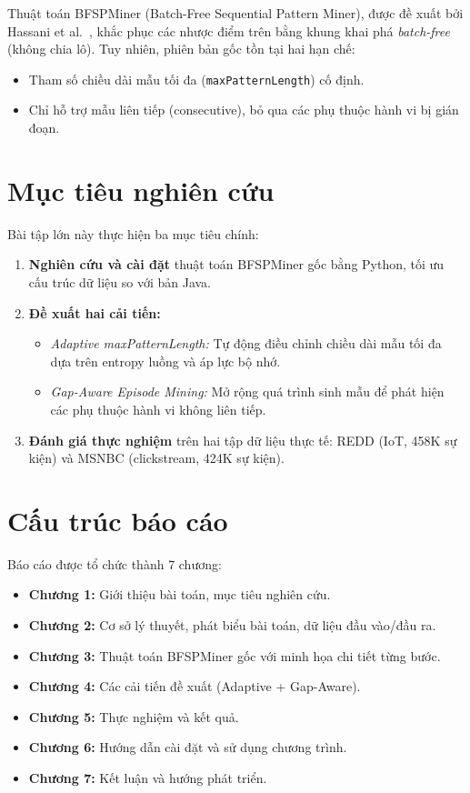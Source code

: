 \documentclass[14pt,a4paper,oneside]{extreport}
\begin{document}
Thuật toán BFSPMiner (Batch-Free Sequential Pattern Miner), được đề xuất bởi Hassani et al.~\cite{hassani2019}, khắc phục các nhược điểm trên bằng khung khai phá \textit{batch-free} (không chia lô). Tuy nhiên, phiên bản gốc tồn tại hai hạn chế:
\begin{itemize}
    \item Tham số chiều dài mẫu tối đa (\texttt{maxPatternLength}) cố định.
    \item Chỉ hỗ trợ mẫu liên tiếp (consecutive), bỏ qua các phụ thuộc hành vi bị gián đoạn.
\end{itemize}

\section{Mục tiêu nghiên cứu}
Bài tập lớn này thực hiện ba mục tiêu chính:
\begin{enumerate}
    \item \textbf{Nghiên cứu và cài đặt} thuật toán BFSPMiner gốc bằng Python, tối ưu cấu trúc dữ liệu so với bản Java.
    \item \textbf{Đề xuất hai cải tiến:}
    \begin{itemize}
        \item \textit{Adaptive maxPatternLength:} Tự động điều chỉnh chiều dài mẫu tối đa dựa trên entropy luồng và áp lực bộ nhớ.
        \item \textit{Gap-Aware Episode Mining:} Mở rộng quá trình sinh mẫu để phát hiện các phụ thuộc hành vi không liên tiếp.
    \end{itemize}
    \item \textbf{Đánh giá thực nghiệm} trên hai tập dữ liệu thực tế: REDD (IoT, 458K sự kiện) và MSNBC (clickstream, 424K sự kiện).
\end{enumerate}

\section{Cấu trúc báo cáo}
Báo cáo được tổ chức thành 7 chương:
\begin{itemize}
    \item \textbf{Chương 1:} Giới thiệu bài toán, mục tiêu nghiên cứu.
    \item \textbf{Chương 2:} Cơ sở lý thuyết, phát biểu bài toán, dữ liệu đầu vào/đầu ra.
    \item \textbf{Chương 3:} Thuật toán BFSPMiner gốc với minh họa chi tiết từng bước.
    \item \textbf{Chương 4:} Các cải tiến đề xuất (Adaptive + Gap-Aware).
    \item \textbf{Chương 5:} Thực nghiệm và kết quả.
    \item \textbf{Chương 6:} Hướng dẫn cài đặt và sử dụng chương trình.
    \item \textbf{Chương 7:} Kết luận và hướng phát triển.
\end{itemize}
\end{document}
